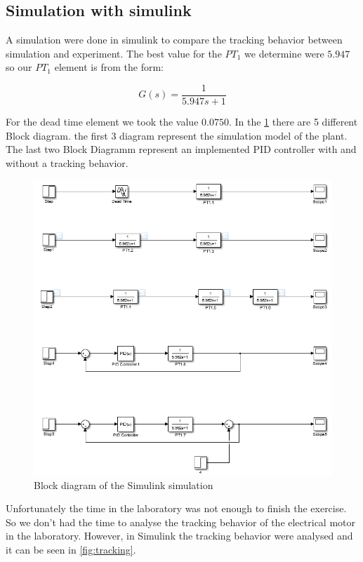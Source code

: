 \subsection{Simulation with simulink}

A simulation were done in  simulink  to  compare the tracking behavior between
simulation and  experiment.  The best value for the $PT_{1}$ we determine were
$5.947$ so our $PT_{1}$ element is from the form:

\begin{equation}
    G(s) = \frac{1}{5.947s+1}
\end{equation}

For   the   dead  time  element  we  took   the   value   $0.0750$.   In   the
\ref{fig:simulink} there are 5 different Block diagram.  the  first  3 diagram
represent  the  simulation  model  of  the  plant. The last two Block Diagramm
represent an implemented PID controller  with and without a tracking behavior.

\begin{figure}
    \centering
    \includegraphics[width=\imagewidth]{images/simulink.png}
    \caption{Block diagram of the Simulink simulation}
    \label{fig:simulink}
\end{figure}

Unfortunately  the  time in the  laboratory  was  not  enough  to  finish  the
exercise. So we don't had the time to analyse  the  tracking  behavior  of the
electrical motor in the laboratory. However, in Simulink the tracking behavior
were analysed and it can be seen in \ref{fig:tracking}.

